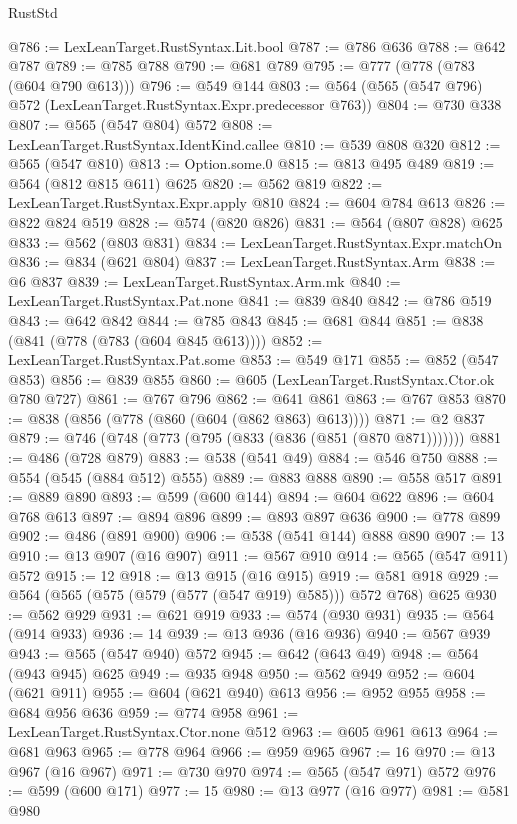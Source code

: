 \begin{lexlean}{RustStd}
\begin{coremodule}
@786 := LexLeanTarget.RustSyntax.Lit.bool
@787 := @786 @636
@788 := @642 @787
@789 := @785 @788
@790 := @681 @789
@795 := @777 (@778 (@783 (@604 @790 @613)))
@796 := @549 @144
@803 := @564 (@565 (@547 @796) @572 (LexLeanTarget.RustSyntax.Expr.predecessor @763))
@804 := @730 @338
@807 := @565 (@547 @804) @572
@808 := LexLeanTarget.RustSyntax.IdentKind.callee
@810 := @539 @808 @320
@812 := @565 (@547 @810)
@813 := Option.some.{0}
@815 := @813 @495 @489
@819 := @564 (@812 @815 @611) @625
@820 := @562 @819
@822 := LexLeanTarget.RustSyntax.Expr.apply @810
@824 := @604 @784 @613
@826 := @822 @824 @519
@828 := @574 (@820 @826)
@831 := @564 (@807 @828) @625
@833 := @562 (@803 @831)
@834 := LexLeanTarget.RustSyntax.Expr.matchOn
@836 := @834 (@621 @804)
@837 := LexLeanTarget.RustSyntax.Arm
@838 := @6 @837
@839 := LexLeanTarget.RustSyntax.Arm.mk
@840 := LexLeanTarget.RustSyntax.Pat.none
@841 := @839 @840
@842 := @786 @519
@843 := @642 @842
@844 := @785 @843
@845 := @681 @844
@851 := @838 (@841 (@778 (@783 (@604 @845 @613))))
@852 := LexLeanTarget.RustSyntax.Pat.some
@853 := @549 @171
@855 := @852 (@547 @853)
@856 := @839 @855
@860 := @605 (LexLeanTarget.RustSyntax.Ctor.ok @780 @727)
@861 := @767 @796
@862 := @641 @861
@863 := @767 @853
@870 := @838 (@856 (@778 (@860 (@604 (@862 @863) @613))))
@871 := @2 @837
@879 := @746 (@748 (@773 (@795 (@833 (@836 (@851 (@870 @871)))))))
@881 := @486 (@728 @879)
@883 := @538 (@541 @49)
@884 := @546 @750
@888 := @554 (@545 (@884 @512) @555)
@889 := @883 @888
@890 := @558 @517
@891 := @889 @890
@893 := @599 (@600 @144)
@894 := @604 @622
@896 := @604 @768 @613
@897 := @894 @896
@899 := @893 @897 @636
@900 := @778 @899
@902 := @486 (@891 @900)
@906 := @538 (@541 @144) @888 @890
@907 := 13
@910 := @13 @907 (@16 @907)
@911 := @567 @910
@914 := @565 (@547 @911) @572
@915 := 12
@918 := @13 @915 (@16 @915)
@919 := @581 @918
@929 := @564 (@565 (@575 (@579 (@577 (@547 @919) @585))) @572 @768) @625
@930 := @562 @929
@931 := @621 @919
@933 := @574 (@930 @931)
@935 := @564 (@914 @933)
@936 := 14
@939 := @13 @936 (@16 @936)
@940 := @567 @939
@943 := @565 (@547 @940) @572
@945 := @642 (@643 @49)
@948 := @564 (@943 @945) @625
@949 := @935 @948
@950 := @562 @949
@952 := @604 (@621 @911)
@955 := @604 (@621 @940) @613
@956 := @952 @955
@958 := @684 @956 @636
@959 := @774 @958
@961 := LexLeanTarget.RustSyntax.Ctor.none @512
@963 := @605 @961 @613
@964 := @681 @963
@965 := @778 @964
@966 := @959 @965
@967 := 16
@970 := @13 @967 (@16 @967)
@971 := @730 @970
@974 := @565 (@547 @971) @572
@976 := @599 (@600 @171)
@977 := 15
@980 := @13 @977 (@16 @977)
@981 := @581 @980

\end{coremodule}
\end{lexlean}
